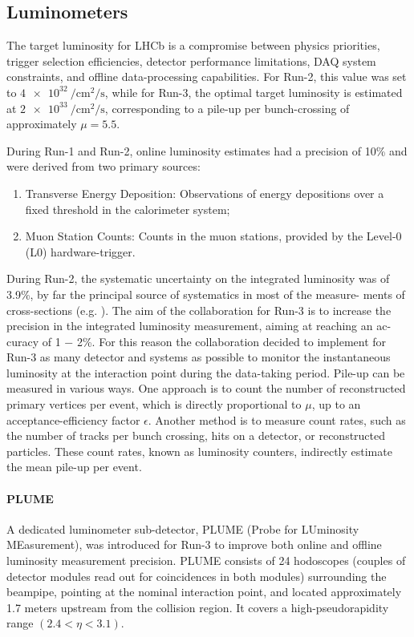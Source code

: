 \subsection{Luminometers}
The target luminosity for LHCb is a compromise between physics priorities, trigger selection efficiencies, detector performance limitations, DAQ system constraints, and offline data-processing capabilities. For Run-2, this value was set to $\SI{4e32}{\per\centi\meter\squared\per\second}$, while for Run-3, the optimal target luminosity is estimated at $\SI{2e33}{\per\centi\meter\squared\per\second}$, corresponding to a pile-up per bunch-crossing of approximately $\mu = 5.5$.

During Run-1 and Run-2, online luminosity estimates had a precision of 10\% and were derived from two primary sources: 
\begin{enumerate}
    \item Transverse Energy Deposition: Observations of energy depositions over a fixed threshold in the calorimeter system;
    \item Muon Station Counts: Counts in the muon stations, provided by the Level-0 (L0) hardware-trigger.
\end{enumerate}
During Run-2, the systematic uncertainty on the integrated luminosity was of 3.9\%, by far the principal source of systematics in most of the measure- ments of cross-sections (e.g. \cite{j-psi}). The aim of the collaboration for Run-3 is to increase the precision in the integrated luminosity measurement, aiming at reaching an ac- curacy of 1 − 2\%\cite{Aaij:1951625}. For this reason the collaboration decided to implement for Run-3 as many detector and systems as possible to monitor the instantaneous luminosity at the interaction point during the data-taking period.
Pile-up can be measured in various ways. One approach is to count the number of reconstructed primary vertices per event, which is directly proportional to $\mu$, up to an acceptance-efficiency factor $\epsilon$. Another method is to measure count rates, such as the number of tracks per bunch crossing, hits on a detector, or reconstructed particles. These count rates, known as luminosity counters, indirectly estimate the mean pile-up per event.

\paragraph{PLUME}
A dedicated luminometer sub-detector, PLUME (Probe for LUminosity MEasurement), was introduced for Run-3 to improve both online and offline luminosity measurement precision. PLUME consists of 24 hodoscopes (couples of detector modules read out for coincidences in both modules) surrounding the beampipe, pointing at the nominal interaction point, and located approximately 1.7 meters upstream from the collision region. It covers a high-pseudorapidity range $(2.4 < \eta < 3.1)$.

